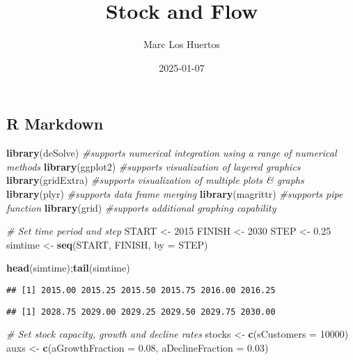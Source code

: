 \documentclass[
]{article}
\title{Stock and Flow}
\author{Marc Los Huertos}
\date{2025-01-07}
\newenvironment{Shaded}{\begin{snugshade}}{\end{snugshade}}
\newcommand{\AttributeTok}[1]{\textcolor[rgb]{0.13,0.29,0.53}{#1}}
\newcommand{\CommentTok}[1]{\textcolor[rgb]{0.56,0.35,0.01}{\textit{#1}}}
\newcommand{\DecValTok}[1]{\textcolor[rgb]{0.00,0.00,0.81}{#1}}
\newcommand{\FloatTok}[1]{\textcolor[rgb]{0.00,0.00,0.81}{#1}}
\newcommand{\FunctionTok}[1]{\textcolor[rgb]{0.13,0.29,0.53}{\textbf{#1}}}
\newcommand{\NormalTok}[1]{#1}
\newcommand{\OtherTok}[1]{\textcolor[rgb]{0.56,0.35,0.01}{#1}}
\begin{document}
\maketitle

\subsection{R Markdown}\label{r-markdown}

\begin{Shaded}
\begin{Highlighting}[]
\FunctionTok{library}\NormalTok{(deSolve) }\CommentTok{\#supports numerical integration using a range of numerical methods}
\FunctionTok{library}\NormalTok{(ggplot2) }\CommentTok{\#supports visualization of layered graphics}
\FunctionTok{library}\NormalTok{(gridExtra) }\CommentTok{\#supports visualization of multiple plots \& graphs}
\FunctionTok{library}\NormalTok{(plyr) }\CommentTok{\#supports data frame merging}
\FunctionTok{library}\NormalTok{(magrittr) }\CommentTok{\#supports pipe function}
\FunctionTok{library}\NormalTok{(grid) }\CommentTok{\#supports additional graphing capability}
\end{Highlighting}
\end{Shaded}

\begin{Shaded}
\begin{Highlighting}[]
\CommentTok{\# Set time period and step}
\NormalTok{START }\OtherTok{\textless{}{-}} \DecValTok{2015}
\NormalTok{FINISH }\OtherTok{\textless{}{-}} \DecValTok{2030}
\NormalTok{STEP }\OtherTok{\textless{}{-}} \FloatTok{0.25}
\NormalTok{simtime }\OtherTok{\textless{}{-}} \FunctionTok{seq}\NormalTok{(START, FINISH, }\AttributeTok{by =}\NormalTok{ STEP)}

\FunctionTok{head}\NormalTok{(simtime);}\FunctionTok{tail}\NormalTok{(simtime)}
\end{Highlighting}
\end{Shaded}

\begin{verbatim}
## [1] 2015.00 2015.25 2015.50 2015.75 2016.00 2016.25
\end{verbatim}

\begin{verbatim}
## [1] 2028.75 2029.00 2029.25 2029.50 2029.75 2030.00
\end{verbatim}

\begin{Shaded}
\begin{Highlighting}[]
\CommentTok{\# Set stock capacity, growth and decline rates}
\NormalTok{stocks }\OtherTok{\textless{}{-}} \FunctionTok{c}\NormalTok{(}\AttributeTok{sCustomers =} \DecValTok{10000}\NormalTok{)}
\NormalTok{auxs }\OtherTok{\textless{}{-}} \FunctionTok{c}\NormalTok{(}\AttributeTok{aGrowthFraction =} \FloatTok{0.08}\NormalTok{, }\AttributeTok{aDeclineFraction =} \FloatTok{0.03}\NormalTok{)}
\end{Highlighting}
\end{Shaded}
\end{document}

